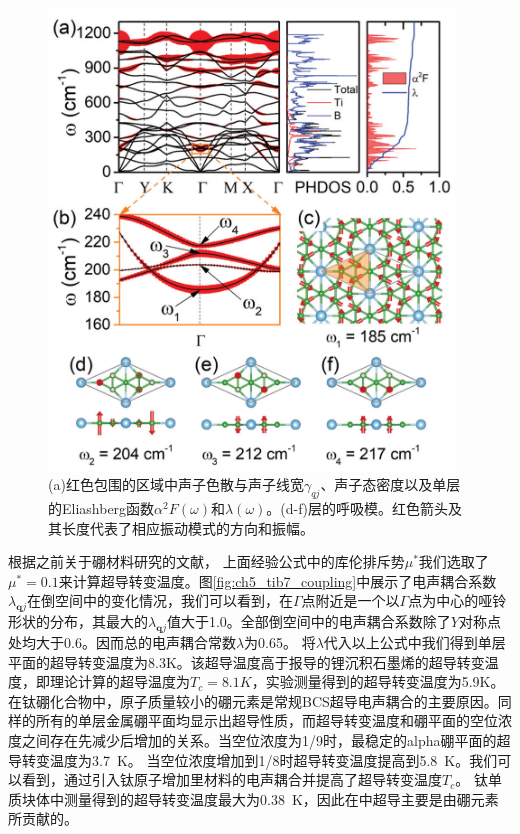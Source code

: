 \begin{figure}
  \includegraphics[width=0.96\textwidth]{figs/ch5_tib7_sc_all.png}
  \centering
  \caption{(a)红色包围的区域中声子色散与声子线宽$\gamma_{qj}$、声子态密度以及单层的Eliashberg函数$\alpha^2 F(\omega)$和$\lambda(\omega)$。(d-f)层的呼吸模。红色箭头及其长度代表了相应振动模式的方向和振幅。}
  \label{fig:ch5_tib7_sc_all}
\end{figure}

根据之前关于硼材料研究的文献\cite{penev2016can,zhao2016superconductivity,zhao2018multigap,liao2017phonon,yan2020superconductivity}，
上面经验公式中的库伦排斥势$\mu^*$我们选取了$\mu^*=0.1$来计算超导转变温度。图\ref{fig:ch5_tib7_coupling}中展示了电声耦合系数$\lambda_{\bm{q}j}$在倒空间中的变化情况，我们可以看到，在$\Gamma$点附近是一个以$\Gamma$点为中心的哑铃形状的分布，其最大的$\lambda_{\bm{q}j}$值大于\num{1.0}。全部倒空间中的电声耦合系数除了$Y$对称点处均大于\num{0.6}。因而总的电声耦合常数$\lambda$为\num{0.65}。
将$\lambda$代入以上公式中我们得到单层平面的超导转变温度为\num{8.3}K。该超导温度高于报导的锂沉积石墨烯的超导转变温度，即理论计算的超导温度为$T_c=8.1K$\cite{profeta2012phonon}，实验测量得到的超导转变温度为\num{5.9}K\cite{ludbrook2015evidence}。
在钛硼化合物中，原子质量较小的硼元素是常规BCS超导电声耦合的主要原因。同样的所有的单层金属硼平面均显示出超导性质，而超导转变温度和硼平面的空位浓度之间存在先减少后增加的关系。当空位浓度为\num{1/9}时，最稳定的alpha硼平面的超导转变温度为\SI{3.7}{\kelvin}。
当空位浓度增加到\num{1/8}时超导转变温度提高到\SI{5.8}{\kelvin}。我们可以看到，通过引入钛原子增加里材料的电声耦合并提高了超导转变温度$T_c$。
钛单质块体中测量得到的超导转变温度最大为\SI{0.38}{\kelvin}\cite{matthias1963superconductivity}，因此在中超导主要是由硼元素所贡献的。

